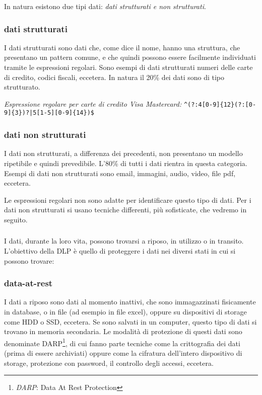     In natura esistono due tipi dati: \textit{dati strutturati e non strutturati}.
        \subsubsection{dati strutturati}
            I dati strutturati sono dati che, come dice il nome, hanno una struttura, che presentano un pattern comune, e che 
            quindi possono essere facilmente individuati tramite le espressioni regolari. 
            Sono esempi di dati strutturati numeri delle carte di credito, codici fiscali, eccetera.
            In natura il 20\% dei dati sono di tipo strutturato. 
    
            \begin{center} 
                \textit{Espressione regolare per carte di credito Visa Mastercard:}
                \verb/^(?:4[0-9]{12}(?:[0-9]{3})?|5[1-5][0-9]{14})$/ 
            \end{center}

        \subsubsection{dati non strutturati}
            I dati non strutturati, a differenza dei precedenti, non presentano un modello ripetibile
            e quindi prevedibile. L'80\% di tutti i dati rientra in questa categoria. Esempi di dati non 
            strutturati sono email, immagini, audio, video, file pdf, eccetera. 
    
    Le espressioni regolari non sono adatte per identificare questo tipo di dati. %
    Per i dati non strutturati si usano tecniche differenti, più sofisticate, che vedremo in seguito. 

    \subsubsection*{}
    I dati, durante la loro vita, possono trovarsi a riposo, in utilizzo o in transito.
    L'obiettivo della DLP è quello di proteggere i dati nei diversi stati in cui si possono trovare:
    \cite{SANS1}

    \subsubsection{data-at-rest}
        I dati a riposo sono dati al momento inattivi, che sono immagazzinati fisicamente in database,
        o in file (ad esempio in file excel), oppure su dispositivi di storage come HDD o SSD, eccetera.
        Se sono salvati in un computer, questo tipo di dati si trovano in memoria secondaria.
        Le modalità di protezione di questi dati sono denominate DARP\footnote{\textit{DARP}: Data At Rest Protection}, 
        di cui fanno parte tecniche come la crittografia dei dati (prima di essere archiviati) oppure come la cifratura
        dell'intero dispositivo di storage, protezione con password, il controllo degli accessi, eccetera.

